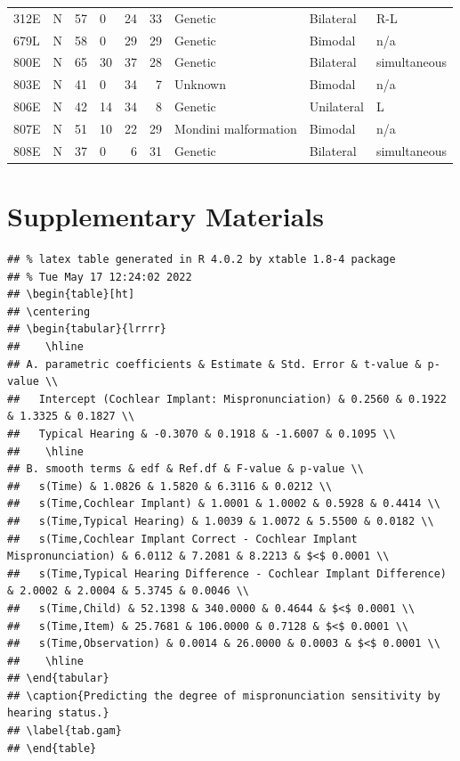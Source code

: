 \documentclass[
]{article}
\begin{document}
\begin{table}[!h]
\begin{tabular}[t]{llrlrrlll}
312E & N & 57 & 0 & 24 & 33 & Genetic & Bilateral & R-L\\
679L & N & 58 & 0 & 29 & 29 & Genetic & Bimodal & n/a\\
\addlinespace
800E & N & 65 & 30 & 37 & 28 & Genetic & Bilateral & simultaneous\\
803E & N & 41 & 0 & 34 & 7 & Unknown & Bimodal & n/a\\
806E & N & 42 & 14 & 34 & 8 & Genetic & Unilateral & L\\
807E & N & 51 & 10 & 22 & 29 & Mondini malformation & Bimodal & n/a\\
808E & N & 37 & 0 & 6 & 31 & Genetic & Bilateral & simultaneous\\
\bottomrule
\end{tabular}
\end{table}

\hypertarget{supplementary-materials}{%
\section{Supplementary Materials}\label{supplementary-materials}}

\begin{verbatim}
## % latex table generated in R 4.0.2 by xtable 1.8-4 package
## % Tue May 17 12:24:02 2022
## \begin{table}[ht]
## \centering
## \begin{tabular}{lrrrr}
##    \hline
## A. parametric coefficients & Estimate & Std. Error & t-value & p-value \\ 
##   Intercept (Cochlear Implant: Mispronunciation) & 0.2560 & 0.1922 & 1.3325 & 0.1827 \\ 
##   Typical Hearing & -0.3070 & 0.1918 & -1.6007 & 0.1095 \\ 
##    \hline
## B. smooth terms & edf & Ref.df & F-value & p-value \\ 
##   s(Time) & 1.0826 & 1.5820 & 6.3116 & 0.0212 \\ 
##   s(Time,Cochlear Implant) & 1.0001 & 1.0002 & 0.5928 & 0.4414 \\ 
##   s(Time,Typical Hearing) & 1.0039 & 1.0072 & 5.5500 & 0.0182 \\ 
##   s(Time,Cochlear Implant Correct - Cochlear Implant Mispronunciation) & 6.0112 & 7.2081 & 8.2213 & $<$ 0.0001 \\ 
##   s(Time,Typical Hearing Difference - Cochlear Implant Difference) & 2.0002 & 2.0004 & 5.3745 & 0.0046 \\ 
##   s(Time,Child) & 52.1398 & 340.0000 & 0.4644 & $<$ 0.0001 \\ 
##   s(Time,Item) & 25.7681 & 106.0000 & 0.7128 & $<$ 0.0001 \\ 
##   s(Time,Observation) & 0.0014 & 26.0000 & 0.0003 & $<$ 0.0001 \\ 
##    \hline
## \end{tabular}
## \caption{Predicting the degree of mispronunciation sensitivity by hearing status.} 
## \label{tab.gam}
## \end{table}
\end{verbatim}
\end{document}
